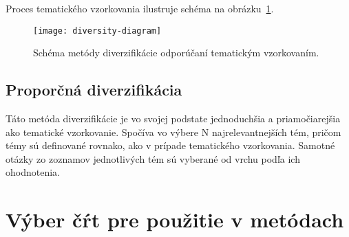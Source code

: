 Proces tematického vzorkovania ilustruje schéma na obrázku~\ref{fig:tematic-sampling}.

\begin{figure}[H]\begin{center}
\texttt{[image: diversity-diagram]}
\caption{Schéma metódy diverzifikácie odporúčaní tematickým vzorkovaním.\label{fig:tematic-sampling}}\end{center}
\end{figure}


\subsection{Proporčná diverzifikácia}
Táto metóda diverzifikácie je vo svojej podstate jednoduchšia a priamočiarejšia ako tematické vzorkovanie. Spočíva
vo výbere N najrelevantnejších tém, pričom témy sú definované rovnako, ako v prípade tematického vzorkovania.
Samotné otázky zo zoznamov jednotlivých tém sú vyberané od vrchu podľa ich ohodnotenia.


\section{Výber čŕt pre použitie v metódach}\label{features}

